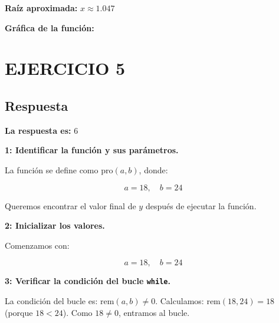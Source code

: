 \documentclass[12pt]{article}
\begin{document}
\noindent\textbf{Raíz aproximada:} \(x \approx 1.047\)

\bigskip
\textbf{Gráfica de la función:}
\begin{center}
\end{center}













\section*{EJERCICIO 5}

\subsection*{Respuesta}

\textbf{La respuesta es:} \( \boxed{6} \)

\textbf{ 1: Identificar la función y sus parámetros.}

La función se define como \( \text{pro}(a, b) \), donde:

\[
a = 18,\quad b = 24
\]

Queremos encontrar el valor final de \( y \) después de ejecutar la función.

\textbf{ 2: Inicializar los valores.}

Comenzamos con:

\[
a = 18,\quad b = 24
\]

\textbf{ 3: Verificar la condición del bucle \texttt{while}.}

La condición del bucle es: \( \text{rem}(a, b) \neq 0 \).  
Calculamos: \( \text{rem}(18, 24) = 18 \) (porque \( 18 < 24 \)).  
Como \( 18 \neq 0 \), entramos al bucle.
\end{document}
